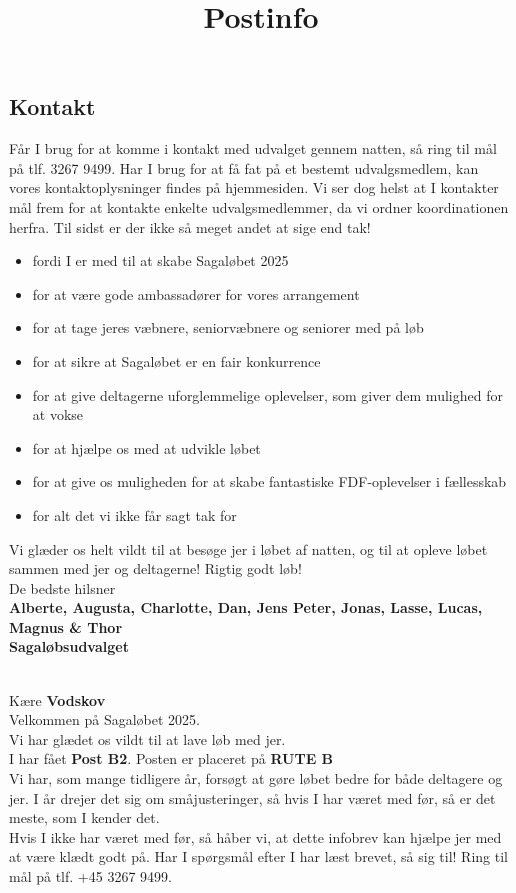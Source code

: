 \subsection{Kontakt}
Får I brug for at komme i kontakt med udvalget gennem natten, så ring til mål på tlf. 3267 9499. Har I brug for at få fat på et bestemt udvalgsmedlem, kan vores kontaktoplysninger findes på hjemmesiden. Vi ser dog helst at I kontakter mål frem for at kontakte enkelte udvalgsmedlemmer, da vi ordner koordinationen herfra.
\newline
Til sidst er der ikke så meget andet at sige end tak!\begin{itemize}
  \item fordi I er med til at skabe Sagaløbet 2025
  \item for at være gode ambassadører for vores arrangement
  \item for at tage jeres væbnere, seniorvæbnere og seniorer med på løb
  \item for at sikre at Sagaløbet er en fair konkurrence
  \item for at give deltagerne uforglemmelige oplevelser, som giver dem mulighed for at vokse
  \item for at hjælpe os med at udvikle løbet
  \item for at give os muligheden for at skabe fantastiske FDF-oplevelser i fællesskab
  \item for alt det vi ikke får sagt tak for
\end{itemize}
Vi glæder os helt vildt til at besøge jer i løbet af natten, og til at opleve løbet sammen med jer og deltagerne!
\newline
Rigtig godt løb!\\
\newline
\textcolor{søblå}{De bedste hilsner}\\
\textcolor{natblå}{\textbf{Alberte, Augusta, Charlotte, Dan, Jens Peter, Jonas, Lasse, Lucas, Magnus \& Thor}}\\
\textcolor{natblå}{\textbf{Sagaløbsudvalget}}\\
\newpage
\title{Postinfo}\\
Kære \textbf{Vodskov}\\
\newline
Velkommen på Sagaløbet 2025.\\
Vi har glædet os vildt til at lave løb med jer.\\
\newline
I har fået \textbf{Post B2}. Posten er placeret på \textbf{RUTE B}\\
Vi har, som mange tidligere år, forsøgt at gøre løbet bedre for både deltagere og jer. I år drejer det sig om småjusteringer, så hvis I har været med før, så er det meste, som I kender det.\\
\newline
Hvis I ikke har været med før, så håber vi, at dette infobrev kan hjælpe jer med at være klædt godt på. Har I spørgsmål efter I har læst brevet, så sig til! Ring til mål på tlf. +45 3267 9499.
